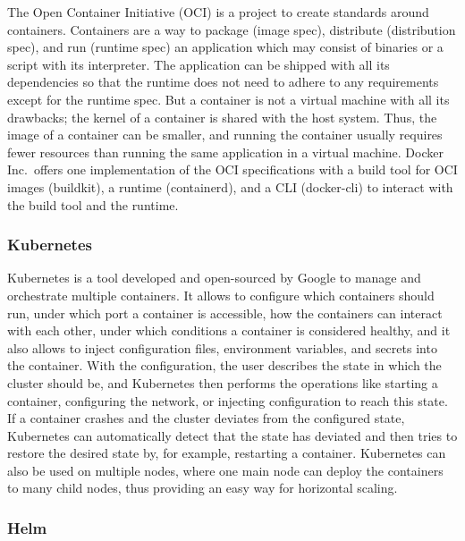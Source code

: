 \documentclass[conference]{IEEEtran}
\begin{document}
The Open Container Initiative (OCI) is a project to create standards around containers\cite{oci-website}.
Containers are a way to package (image spec), distribute (distribution spec), and run (runtime spec) an application
which may consist of binaries or a script with its interpreter.
The application can be shipped with all its dependencies so that the runtime does not need to adhere to any
requirements except for the runtime spec.
But a container is not a virtual machine with all its drawbacks; the kernel of a container is shared with the host system.
Thus, the image of a container can be smaller, and running the container usually requires fewer resources than running the same application
in a virtual machine.
Docker Inc.\ offers one implementation of the OCI specifications with a build tool for OCI images (buildkit), a runtime (containerd),
and a CLI (docker-cli) to interact with the build tool and the runtime\cite{docker-container-runtime-website}.

\subsubsection{Kubernetes}

Kubernetes is a tool developed and open-sourced by Google to manage and orchestrate multiple containers\cite{kubernetes-docs}.
It allows to configure which containers should run, under which port a container is accessible,
how the containers can interact with each other, under which conditions a container is considered healthy, and it also allows
to inject configuration files, environment variables, and secrets into the container\cite{kubernetes-docs}.
With the configuration, the user describes the state in which the cluster should be, and Kubernetes then performs the
operations like starting a container, configuring the network, or injecting configuration to reach this state\cite{kubernetes-docs}.
If a container crashes and the cluster deviates from the configured state, Kubernetes can automatically detect that
the state has deviated and then tries to restore the desired state by, for example, restarting a container\cite{kubernetes-docs}.
Kubernetes can also be used on multiple nodes, where one main node can deploy the containers to many child nodes,
thus providing an easy way for horizontal scaling\cite{kubernetes-docs}.

\subsubsection{Helm}
\end{document}
